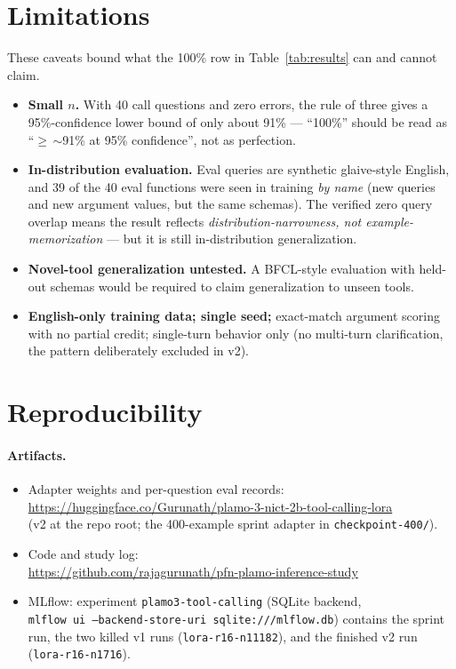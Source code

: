 \documentclass[10pt]{article}
\begin{document}
\section{Limitations}
\label{sec:limitations}

These caveats bound what the 100\% row in Table~\ref{tab:results} can and cannot claim.

\begin{itemize}
\item \textbf{Small $n$.} With 40 call questions and zero errors, the rule of three
  gives a 95\%-confidence lower bound of only about 91\% --- ``100\%'' should be read as
  ``$\geq$\,$\sim$91\% at 95\% confidence'', not as perfection.
\item \textbf{In-distribution evaluation.} Eval queries are synthetic glaive-style
  English, and 39 of the 40 eval functions were seen in training \emph{by name} (new
  queries and new argument values, but the same schemas). The verified zero query
  overlap means the result reflects \emph{distribution-narrowness, not
  example-memorization} --- but it is still in-distribution generalization.
\item \textbf{Novel-tool generalization untested.} A BFCL-style evaluation with held-out
  schemas would be required to claim generalization to unseen tools.
\item \textbf{English-only training data; single seed;} exact-match argument scoring
  with no partial credit; single-turn behavior only (no multi-turn clarification, the
  pattern deliberately excluded in v2).
\end{itemize}

\section{Reproducibility}
\label{sec:repro}

\paragraph{Artifacts.}
\begin{itemize}
\item Adapter weights and per-question eval records:\\
  {\small\url{https://huggingface.co/Gurunath/plamo-3-nict-2b-tool-calling-lora}}\\
  (v2 at the repo root; the 400-example sprint adapter in \texttt{checkpoint-400/}).
\item Code and study log:\\
  {\small\url{https://github.com/rajagurunath/pfn-plamo-inference-study}}
\item MLflow: experiment \texttt{plamo3-tool-calling} (SQLite backend,\\
  \texttt{mlflow ui --backend-store-uri sqlite:///mlflow.db}) contains the sprint run,
  the two killed v1 runs (\texttt{lora-r16-n11182}), and the finished v2 run
  (\texttt{lora-r16-n1716}).
\end{itemize}
\end{document}
